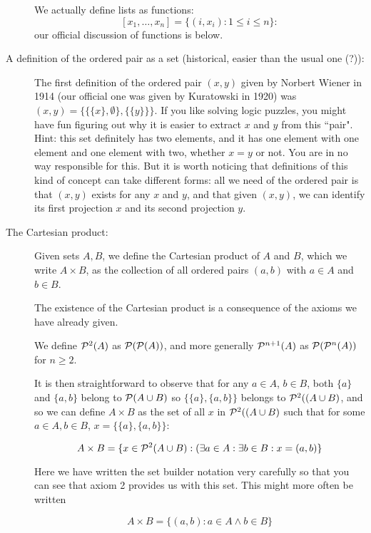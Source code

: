 \documentclass[12pt]{article}
\begin{document}
\begin{description}
We actually define lists as functions:  $$[x_1,\ldots,x_n] = \{(i,x_i):1 \leq i \leq n\}:$$ our official discussion of functions is below.

\item[A definition of the ordered pair as a set (historical, easier than the usual one (?)):]

The first definition of the ordered pair $(x,y)$ given by Norbert Wiener in 1914 (our official one was given by Kuratowski in 1920) was $(x,y) = \{\{\{x\},\emptyset\},\{\{y\}\}\}$.  If you like solving logic puzzles, you might have fun figuring out why it is easier to extract $x$ and $y$ from this ``pair".  Hint:  this set definitely has two elements, and it has one element with one element and one element with two, whether $x=y$ or not.  You are in no way responsible for this.  But it is worth noticing that definitions of this kind of concept can take different forms:  all we need of the ordered pair is that $(x,y)$ exists for any $x$ and $y$, and that given $(x,y)$, we can identify its first projection $x$ and its second projection $y$.



\item[The Cartesian product:]

Given sets $A,B$, we define the Cartesian product of $A$ and $B$, which we write $A \times B$,  as the collection of all ordered pairs
$(a,b)$ with $a \in A$ and $b \in B$.

The existence of the Cartesian product is a consequence of the axioms we have already given.

We define ${\cal P}^2(A)$ as ${\cal P}({\cal P}(A))$, and more generally ${\cal P}^{n+1}(A)$ as 
${\cal P}({\cal P}^n(A))$ for $n \geq 2$.

It is then straightforward to observe that for any $a \in A$, $b \in B$, both $\{a\}$ and $\{a,b\}$ belong to ${\cal P}(A \cup B)$ so $\{\{a\},\{a,b\}\}$ belongs to ${\cal P}^2((A \cup B)$, and so we can define $A \times B$ as the set of all $x$ in ${\cal P}^2((A \cup B)$ such that for some $a\in A, b\in B$, $x = \{\{a\},\{a,b\}\}$:

$$A \times B = \{x \in {\cal P}^2(A \cup B):(\exists a \in A:\exists b \in B:x=(a,b)\}$$

Here we have written the set builder notation very carefully so that you can see that axiom 2 provides us with this set.  This might more often be written

$$A \times B = \{(a,b):a \in A \wedge b \in B\}$$


\end{description}
\end{document}
